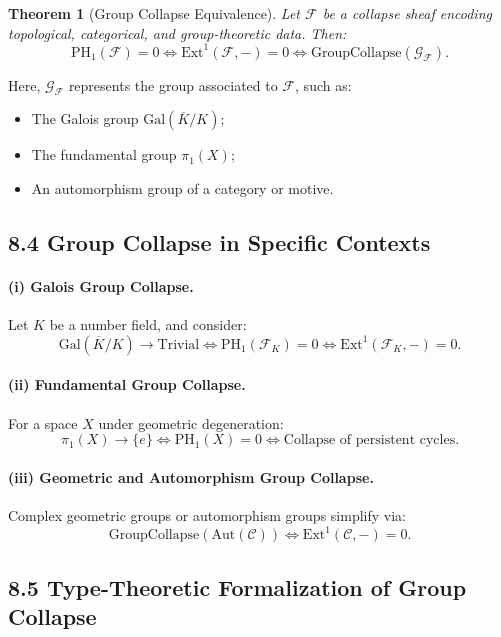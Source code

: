 \documentclass[11pt]{article}
\newtheorem{theorem}{Theorem}[section]
\begin{document}
\begin{theorem}[Group Collapse Equivalence]
Let \( \mathcal{F} \) be a collapse sheaf encoding topological, categorical, and group-theoretic data. Then:
\[
\mathrm{PH}_1(\mathcal{F}) = 0 \iff \mathrm{Ext}^1(\mathcal{F}, -) = 0 \iff \mathrm{GroupCollapse}(\mathcal{G}_{\mathcal{F}}).
\]
\end{theorem}

Here, \( \mathcal{G}_{\mathcal{F}} \) represents the group associated to \( \mathcal{F} \), such as:

\begin{itemize}
    \item The Galois group \( \mathrm{Gal}(\overline{K}/K) \);
    \item The fundamental group \( \pi_1(X) \);
    \item An automorphism group of a category or motive.
\end{itemize}

\subsection*{8.4 Group Collapse in Specific Contexts}

\paragraph{(i) Galois Group Collapse.}
Let \( K \) be a number field, and consider:
\[
\mathrm{Gal}(\overline{K}/K) \longrightarrow \mathrm{Trivial} \iff \mathrm{PH}_1(\mathcal{F}_K) = 0 \iff \mathrm{Ext}^1(\mathcal{F}_K, -) = 0.
\]

\paragraph{(ii) Fundamental Group Collapse.}
For a space \( X \) under geometric degeneration:
\[
\pi_1(X) \longrightarrow \{e\} \iff \mathrm{PH}_1(X) = 0 \iff \text{Collapse of persistent cycles}.
\]

\paragraph{(iii) Geometric and Automorphism Group Collapse.}
Complex geometric groups or automorphism groups simplify via:
\[
\mathrm{GroupCollapse}(\mathrm{Aut}(\mathcal{C})) \iff \mathrm{Ext}^1(\mathcal{C}, -) = 0.
\]

\subsection*{8.5 Type-Theoretic Formalization of Group Collapse}
\end{document}
